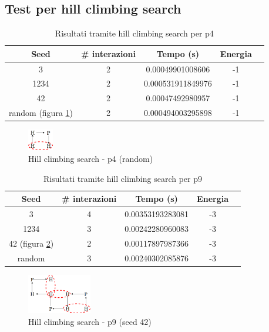 \documentclass[conference]{IEEEtran}
\begin{document}
\subsection{Test per hill climbing search}

\begin{table}[h]
\begin{center}
\begin{tabular}{|c|c|c|c|c|}
\hline
\textbf{Seed} & \textbf{\# interazioni} & \textbf{Tempo (s)} & \textbf{Energia} \\ \hline
3 & 2 & 0.00049901008606 & -1 \\ \hline
1234 & 2 & 0.000531911849976 & -1 \\ \hline
42 & 2 & 0.00047492980957 & -1 \\ \hline
random (figura \ref{fig:lsp4}) & 2 & 0.000494003295898 & -1 \\ \hline
\end{tabular}
\end{center}
\caption{Risultati tramite hill climbing search per p4}
\end{table}

\begin{figure}[H]
\centering
\includegraphics[width=0.10\textwidth]{figure/p4LS.png}
\caption{Hill climbing search - p4 (random)}
\label{fig:lsp4}
\end{figure}

\begin{table}[H]
\begin{center}
\begin{tabular}{|c|c|c|c|c|}
\hline
\textbf{Seed} & \textbf{\# interazioni} & \textbf{Tempo (s)} & \textbf{Energia} \\ \hline
3 & 4 & 0.00353193283081 & -3 \\ \hline
1234 & 3 & 0.00242280960083 & -3 \\ \hline
42 (figura \ref{fig:lsp9}) & 2 & 0.00117897987366 & -3 \\ \hline
random & 3 & 0.00240302085876 & -3 \\ \hline
\end{tabular}
\end{center}
\caption{Risultati tramite hill climbing search per p9}
\end{table}

\begin{figure}[H]
\centering
\includegraphics[width=0.25\textwidth]{figure/p9LS.png}
\caption{Hill climbing search - p9 (seed 42)}
\label{fig:lsp9}
\end{figure}
\end{document}
